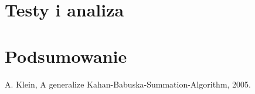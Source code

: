 \documentclass[11pt, wide]{article}
\begin{document}
    \section{Testy i analiza}
    \section{Podsumowanie}
\begin{thebibliography}{9}
    \itemsep2pt
     A. Klein, A generalize Kahan-Babuska-Summation-Algorithm, 2005.
\end{thebibliography}    
\end{document}
